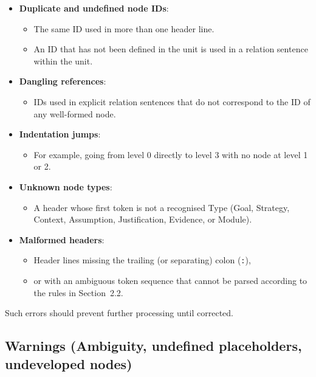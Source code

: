 \documentclass[11pt,twoside,a4paper]{article}
\begin{document}
\begin{itemize}[leftmargin=2em]
  \item \textbf{Duplicate and undefined node IDs}:
  \begin{itemize}[leftmargin=1.5em]
    \item The same ID used in more than one header line.
    \item An ID that has not been defined in the unit is used in a relation sentence within the unit.
  \end{itemize}

  \item \textbf{Dangling references}:
  \begin{itemize}[leftmargin=1.5em]
    \item IDs used in explicit relation sentences that do not correspond to the ID of any well-formed node.
  \end{itemize}

  \item \textbf{Indentation jumps}:
  \begin{itemize}[leftmargin=1.5em]
    \item For example, going from level 0 directly to level 3 with no node at level 1 or 2.
  \end{itemize}

  \item \textbf{Unknown node types}:
  \begin{itemize}[leftmargin=1.5em]
    \item A header whose first token is not a recognised Type (Goal, Strategy, Context, Assumption, Justification, Evidence, or Module).
  \end{itemize}

  \item \textbf{Malformed headers}:
  \begin{itemize}[leftmargin=1.5em]
    \item Header lines missing the trailing (or separating) colon (\texttt{:}),
    \item or with an ambiguous token sequence that cannot be parsed according to the rules in Section~2.2.
  \end{itemize}
\end{itemize}

Such errors should prevent further processing until corrected.

\subsection{Warnings (Ambiguity, undefined placeholders, undeveloped nodes)}
\end{document}
